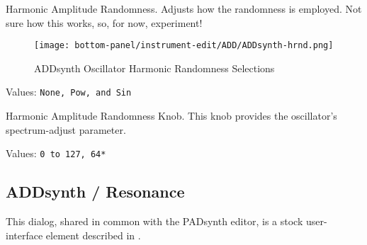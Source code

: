    Harmonic Amplitude Randomness.
   Adjusts how the randomness is employed.
   Not sure how this works, so, for now, experiment!

\begin{figure}[H]
   \centering 
   \texttt{[image: bottom-panel/instrument-edit/ADD/ADDsynth-hrnd.png]}
   \caption{ADDsynth Oscillator Harmonic Randomness Selections}
   \label{fig:addsynth_hrnd}
\end{figure}

   Values: \texttt{None, Pow, and Sin}

   Harmonic Amplitude Randomness Knob.
   This knob provides the oscillator's spectrum-adjust parameter.

   Values: \texttt{0 to 127, 64*}

\subsection{ADDsynth / Resonance}
\label{subsec:addsynth_resonance}

   This dialog, shared in common with the PADsynth editor, is a stock
   user-interface element described in
   .

